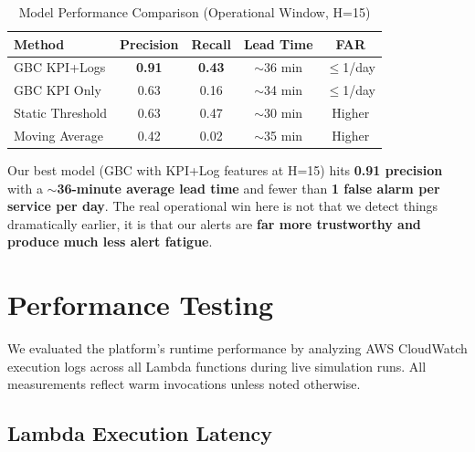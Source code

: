 \documentclass[11pt,a4paper]{article}
\begin{document}
\begin{table}[H]
\centering
\begin{tabular}{lcccc}
\toprule
\textbf{Method} & \textbf{Precision} & \textbf{Recall} & \textbf{Lead Time} & \textbf{FAR} \\
\midrule
GBC KPI+Logs & \textbf{0.91} & \textbf{0.43} & $\sim$36 min & $\leq$1/day \\
GBC KPI Only & 0.63 & 0.16 & $\sim$34 min & $\leq$1/day \\
Static Threshold & 0.63 & 0.47 & $\sim$30 min & Higher \\
Moving Average & 0.42 & 0.02 & $\sim$35 min & Higher \\
\bottomrule
\end{tabular}
\caption{Model Performance Comparison (Operational Window, H=15)}
\label{tab:model-performance}
\end{table}

\begin{successbox}
Our best model (GBC with KPI+Log features at H=15) hits \textbf{0.91 precision} with a \textbf{$\sim$36-minute average lead time} and fewer than \textbf{1 false alarm per service per day}. The real operational win here is not that we detect things dramatically earlier, it is that our alerts are \textbf{far more trustworthy and produce much less alert fatigue}.
\end{successbox}

\section{Performance Testing}

We evaluated the platform's runtime performance by analyzing AWS CloudWatch execution logs across all Lambda functions during live simulation runs. All measurements reflect warm invocations unless noted otherwise.

\subsection{Lambda Execution Latency}
\end{document}
